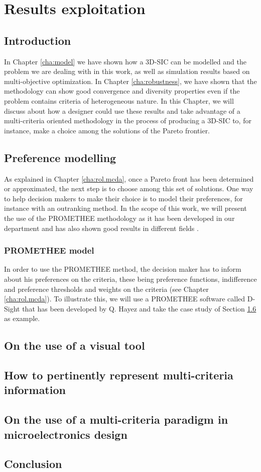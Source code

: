 \chapter{Results exploitation}

\begin{summary}
\lipsum[1]
\end{summary}

\section{Introduction}
In Chapter \ref{cha:model} we have shown how a 3D-SIC can be modelled and the problem we are dealing with in this work, as well as simulation results based on multi-objective optimization. In Chapter \ref{cha:robustness}, we have shown that the methodology can show good convergence and diversity properties even if the problem contains criteria of heterogeneous nature. In this Chapter, we will discuss about how a designer could use these results and take advantage of a multi-criteria oriented methodology in the process of producing a 3D-SIC to, for instance, make a choice among the solutions of the Pareto frontier.

\section{Preference modelling}
As explained in Chapter \ref{cha:rol.mcda}, once a Pareto front has been determined or approximated, the next step is to choose among this set of solutions. One way to help decision makers to make their choice is to model their preferences, for instance with an outranking method. In the scope of this work, we will present the use of the PROMETHEE methodology as it has been developed in our department and has also shown good results in different fields \cite{Beh2010}.

\subsection{PROMETHEE model}
In order to use the PROMETHEE method, the decision maker has to inform about his preferences on the criteria, these being preference functions, indifference and preference thresholds and weights on the criteria (see Chapter \ref{cha:rol.mcda}). To illustrate this, we will use a PROMETHEE software called D-Sight that has been developed by Q. Hayez and take the case study of Section \ref{} as example.

\section{On the use of a visual tool}


\section{How to pertinently represent multi-criteria information}


\section{On the use of a multi-criteria paradigm in microelectronics design}


\section{Conclusion}